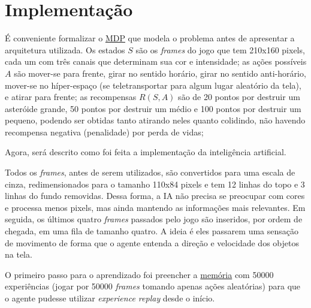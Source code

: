 % 



\chapter{Implementação}
\label{cap:implementacao}


É conveniente formalizar o \hyperref[sec:mdp]{MDP} que modela o problema antes de apresentar a arquitetura utilizada.
Os estados $S$ são os \textit{frames} do jogo que tem 210x160 pixels, cada um com três canais que determinam sua cor e intensidade;
as ações possíveis $A$ são mover-se para frente, girar no sentido horário, girar no sentido anti-horário, mover-se no híper-espaço (se teletransportar para algum lugar aleatório da tela), e atirar para frente;
as recompensas $R(S,A)$ são de 20 pontos por destruir um asteróide grande, 50 pontos por destruir um médio e 100 pontos por destruir um pequeno, podendo ser obtidas tanto atirando neles quanto colidindo, não havendo recompensa negativa (penalidade) por perda de vidas;

Agora, será descrito como foi feita a implementação da inteligência artificial.

Todos os \textit{frames}, antes de serem utilizados, são convertidos para uma escala de cinza, redimensionados para o tamanho 110x84 pixels e tem 12 linhas do topo e 3 linhas do fundo removidas.
Dessa forma, a IA não precisa se preocupar com cores e processa menos pixels, mas ainda mantendo as informações mais relevantes.
Em seguida, os últimos quatro \textit{frames} passados pelo jogo são inseridos, por ordem de chegada, em uma fila de tamanho quatro.
A ideia é eles passarem uma sensação de movimento de forma que o agente entenda a direção e velocidade dos objetos na tela.

O primeiro passo para o aprendizado foi preencher a \hyperref[sec:er]{memória} com 50000 experiências (jogar por 50000 \textit{frames} tomando apenas ações aleatórias) para que o agente pudesse utilizar \textit{experience replay} desde o início.

